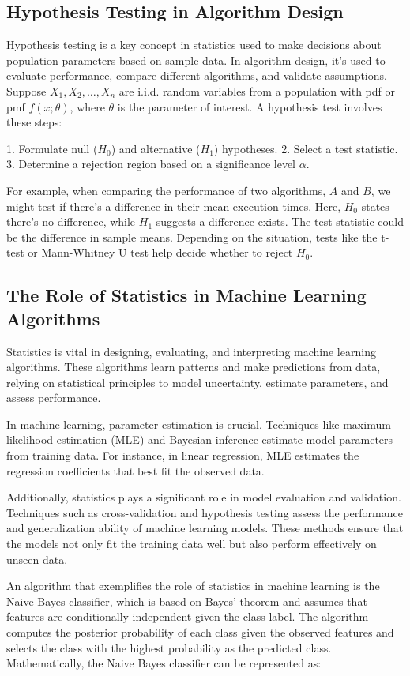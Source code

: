 \documentclass[12pt]{book} %
\begin{document}
\subsection{Hypothesis Testing in Algorithm Design}
Hypothesis testing is a key concept in statistics used to make decisions about population parameters based on sample data. In algorithm design, it's used to evaluate performance, compare different algorithms, and validate assumptions. Suppose \(X_1, X_2, \ldots, X_n\) are i.i.d. random variables from a population with pdf or pmf \(f(x; \theta)\), where \(\theta\) is the parameter of interest. A hypothesis test involves these steps:

1. Formulate null (\(H_0\)) and alternative (\(H_1\)) hypotheses.
2. Select a test statistic.
3. Determine a rejection region based on a significance level \(\alpha\).

For example, when comparing the performance of two algorithms, \(A\) and \(B\), we might test if there's a difference in their mean execution times. Here, \(H_0\) states there's no difference, while \(H_1\) suggests a difference exists. The test statistic could be the difference in sample means. Depending on the situation, tests like the t-test or Mann-Whitney U test help decide whether to reject \(H_0\).

\subsection{The Role of Statistics in Machine Learning Algorithms}
Statistics is vital in designing, evaluating, and interpreting machine learning algorithms. These algorithms learn patterns and make predictions from data, relying on statistical principles to model uncertainty, estimate parameters, and assess performance.

In machine learning, parameter estimation is crucial. Techniques like maximum likelihood estimation (MLE) and Bayesian inference estimate model parameters from training data. For instance, in linear regression, MLE estimates the regression coefficients that best fit the observed data.

Additionally, statistics plays a significant role in model evaluation and validation. Techniques such as cross-validation and hypothesis testing assess the performance and generalization ability of machine learning models. These methods ensure that the models not only fit the training data well but also perform effectively on unseen data.


An algorithm that exemplifies the role of statistics in machine learning is the Naive Bayes classifier, which is based on Bayes' theorem and assumes that features are conditionally independent given the class label. The algorithm computes the posterior probability of each class given the observed features and selects the class with the highest probability as the predicted class. Mathematically, the Naive Bayes classifier can be represented as:
\end{document}
